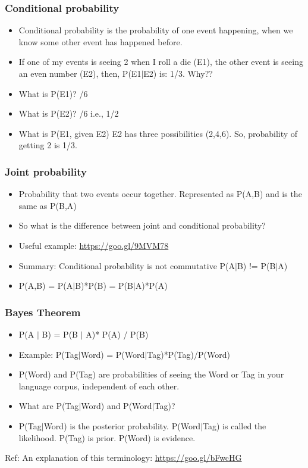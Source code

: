 \documentclass{beamer}
\begin{document}
\begin{frame}
\frametitle{Conditional probability}
\begin{itemize}
\item Conditional probability is the probability of one event happening, when we know some other event has happened before.
\item If one of my events is seeing 2 when I roll a die (E1), the other event is seeing an even number (E2), then, P(E1$|$E2) is: 1/3. Why?? \pause
\item What is P(E1)? /6
\item What is P(E2)? /6 i.e., 1/2
\item What is P(E1, given E2) \pause E2 has three possibilities (2,4,6). So, probability of getting 2 is 1/3.
\end{itemize}
\end{frame}

\begin{frame}
\frametitle{Joint probability}
\begin{itemize}
\item Probability that two events occur together. Represented as P(A,B) and is the same as P(B,A)
\item So what is the difference between joint and conditional probability? \pause
\item Useful example: \url{https://goo.gl/9MVM78} \pause
\item Summary: Conditional probability is not commutative P(A$|$B) != P(B$|$A)
\item P(A,B) = P(A$|$B)*P(B) =  P(B$|$A)*P(A)
\end{itemize}
\end{frame}

\begin{frame}
\frametitle{Bayes Theorem}
\begin{itemize}
\item P(A $|$ B) = P(B $|$ A)* P(A) / P(B)
\item Example: P(Tag$|$Word) = P(Word$|$Tag)*P(Tag)/P(Word)
\item P(Word) and P(Tag) are probabilities of seeing the Word or Tag in your language corpus, independent of each other.
\item What are P(Tag$|$Word) and P(Word$|$Tag)? \pause
\item P(Tag$|$Word) is the posterior probability. P(Word$|$Tag) is called the likelihood. P(Tag) is prior. P(Word) is evidence.
\end{itemize}
Ref: An explanation of this terminology: \url{https://goo.gl/bFwcHG}
\end{frame}
\end{document}
